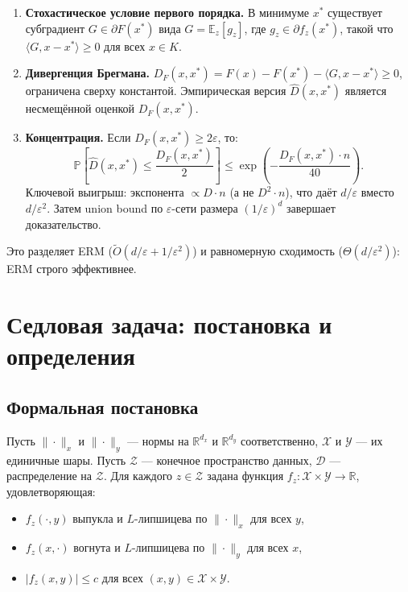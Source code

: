 \documentclass[12pt,a4paper]{article}
\theoremstyle{plain}
\theoremstyle{definition}
\newcommand{\E}{\mathbb{E}}
\renewcommand{\Pr}{\mathbb{P}}
\newcommand{\R}{\mathbb{R}}
\newcommand{\cX}{\mathcal{X}}
\newcommand{\cY}{\mathcal{Y}}
\newcommand{\cZ}{\mathcal{Z}}
\newcommand{\cD}{\mathcal{D}}
\newcommand{\hatD}{\hat{D}}
\begin{document}
\begin{enumerate}
\item \textbf{Стохастическое условие первого порядка.} В минимуме $x^*$ существует субградиент $G\in\partial F(x^*)$ вида $G=\E_z[g_z]$, где $g_z\in\partial f_z(x^*)$, такой что $\langle G,x-x^*\rangle\ge 0$ для всех $x\in K$.

\item \textbf{Дивергенция Брегмана.} $D_F(x,x^*)=F(x)-F(x^*)-\langle G,x-x^*\rangle\ge 0$, ограничена сверху константой. Эмпирическая версия $\hatD(x,x^*)$ является несмещённой оценкой $D_F(x,x^*)$.

\item \textbf{Концентрация.} Если $D_F(x,x^*)\ge 2\varepsilon$, то:
\[
    \Pr\!\left[\hatD(x,x^*)\le\frac{D_F(x,x^*)}{2}\right]\le\exp\!\left(-\frac{D_F(x,x^*)\cdot n}{40}\right).
\]
Ключевой выигрыш: экспонента $\propto D\cdot n$ (а не $D^2\cdot n$), что даёт $d/\varepsilon$ вместо $d/\varepsilon^2$. Затем union bound по $\varepsilon$-сети размера $(1/\varepsilon)^d$ завершает доказательство.
\end{enumerate}

Это разделяет ERM ($\tilde{O}(d/\varepsilon+1/\varepsilon^2)$) и равномерную сходимость ($\Theta(d/\varepsilon^2)$): ERM строго эффективнее.

\section{Седловая задача: постановка и определения}

\subsection{Формальная постановка}

Пусть $\|\cdot\|_x$ и $\|\cdot\|_y$ --- нормы на $\R^{d_x}$ и $\R^{d_y}$ соответственно, $\cX$ и $\cY$ --- их единичные шары. Пусть $\cZ$ --- конечное пространство данных, $\cD$ --- распределение на $\cZ$. Для каждого $z\in\cZ$ задана функция $f_z:\cX\times\cY\to\R$, удовлетворяющая:
\begin{itemize}
    \item $f_z(\cdot,y)$ выпукла и $L$-липшицева по $\|\cdot\|_x$ для всех $y$,
    \item $f_z(x,\cdot)$ вогнута и $L$-липшицева по $\|\cdot\|_y$ для всех $x$,
    \item $|f_z(x,y)|\le c$ для всех $(x,y)\in\cX\times\cY$.
\end{itemize}
\end{document}
